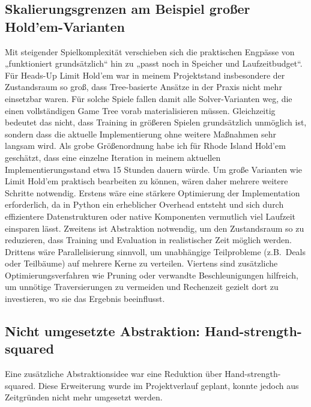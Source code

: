 \subsection{Skalierungsgrenzen am Beispiel großer Hold'em-Varianten}
Mit steigender Spielkomplexität verschieben sich die praktischen Engpässe von „funktioniert grundsätzlich“ hin zu „passt noch in Speicher und Laufzeitbudget“.
Für Heads-Up Limit Hold'em war in meinem Projektstand insbesondere der Zustandsraum so groß, dass Tree-basierte Ansätze in der Praxis nicht mehr einsetzbar waren.
Für solche Spiele fallen damit alle Solver-Varianten weg, die einen vollständigen Game Tree vorab materialisieren müssen.
Gleichzeitig bedeutet das nicht, dass Training in größeren Spielen grundsätzlich unmöglich ist, sondern dass die aktuelle Implementierung ohne weitere Maßnahmen sehr langsam wird.
Als grobe Größenordnung habe ich für Rhode Island Hold'em geschätzt, dass eine einzelne Iteration in meinem aktuellen Implementierungsstand etwa 15 Stunden dauern würde.
Um große Varianten wie Limit Hold'em praktisch bearbeiten zu können, wären daher mehrere weitere Schritte notwendig.
Erstens wäre eine stärkere Optimierung der Implementation erforderlich, da in Python ein erheblicher Overhead entsteht und sich durch effizientere Datenstrukturen oder native Komponenten vermutlich viel Laufzeit einsparen lässt.
Zweitens ist Abstraktion notwendig, um den Zustandsraum so zu reduzieren, dass Training und Evaluation in realistischer Zeit möglich werden.
Drittens wäre Parallelisierung sinnvoll, um unabhängige Teilprobleme (z.B.\ Deals oder Teilbäume) auf mehrere Kerne zu verteilen.
Viertens sind zusätzliche Optimierungsverfahren wie Pruning oder verwandte Beschleunigungen hilfreich, um unnötige Traversierungen zu vermeiden und Rechenzeit gezielt dort zu investieren, wo sie das Ergebnis beeinflusst.

\subsection{Nicht umgesetzte Abstraktion: Hand-strength-squared}
Eine zusätzliche Abstraktionsidee war eine Reduktion über Hand-strength-squared.
Diese Erweiterung wurde im Projektverlauf geplant, konnte jedoch aus Zeitgründen nicht mehr umgesetzt werden.

